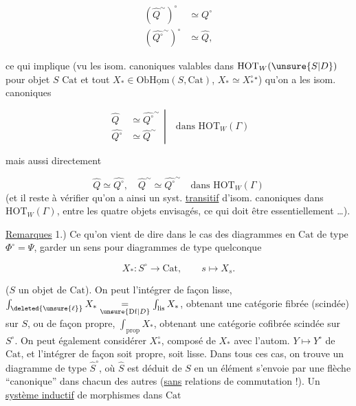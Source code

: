 \[
\begin{aligned}
(\widehat Q^{\sim})^\circ &\simeq \widehat{Q^\circ}\\
(\widehat{Q^\circ}^{\sim})^\circ &\simeq \widehat Q,
\end{aligned}
\]


ce qui implique (vu les isom. canoniques valables dans $\mathrm{HOT}_W(\unsure{S|D})$ pour  objet $S$  $\mathrm{Cat}$ et tout $X_*\in\mathrm{Ob}\underline{\mathrm{Hom}}(S,\mathrm{Cat})$, $X_*\simeq X_*^\circ$${}^{\star}$) qu'on a les isom. canoniques

\[
\left.\begin{aligned}
\widehat Q&\simeq\widehat{Q^\circ}^{\sim}\\
\widehat{Q^\circ}&\simeq\widehat Q^{\sim}
\end{aligned}\right|\quad\text{dans }\mathrm{HOT}_W(\Gamma)
\]

mais aussi directement

\[
\widehat Q\simeq\widehat{Q^\circ},\quad \widehat Q^{\sim}\simeq\widehat{Q^\circ}^{\sim}\quad\text{dans }\mathrm{HOT}_W(\Gamma)
\]
(et il reste à vérifier qu'on a ainsi un syst. \uline{transitif} d'isom. canoniques dans $\mathrm{HOT}_W(\Gamma)$, entre les quatre objets envisagés, \deleted{\unsure{)}} ce qui doit être essentiellement \ldots).

\uline{Remarques} 1.) Ce qu'on vient de dire dans le cas des diagrammes en $\mathrm{Cat}$ de type $\Phi^\circ=\Psi$,  garder un sens pour  diagrammes de type quelconque

\[
X_*:S^\circ\longrightarrow\mathrm{Cat},\qquad s\longmapsto X_s .
\]

($S$ un objet de $\mathrm{Cat}$). On peut l'intégrer de façon lisse, $\int_{\deleted{\unsure{\ell}}}X_*\underset{\unsure{\mathrm{Df}|{D}}}{=}\int_{\mathrm{lis}}X_*$, obtenant une catégorie fibrée (scindée) sur $S$, ou de façon propre, $\int_{\mathrm{prop}}X_*$, obtenant une catégorie cofibrée scindée sur $S^\circ$. On peut également considérer $X_*^\circ$, composé de $X_*$ avec l'autom. $Y\longmapsto Y^\circ$ de $\mathrm{Cat}$, et l'intégrer de façon soit propre, soit lisse. Dans tous ces cas, on trouve un diagramme de type $\widehat S^\circ$, où $\widehat S$ est déduit de $S$ en  un élément      s'envoie par une flèche ``canonique''  dans chacun des autres (\uline{sans} relations de commutation !). Un
\uline{système inductif} de morphismes dans $\mathrm{Cat}$

